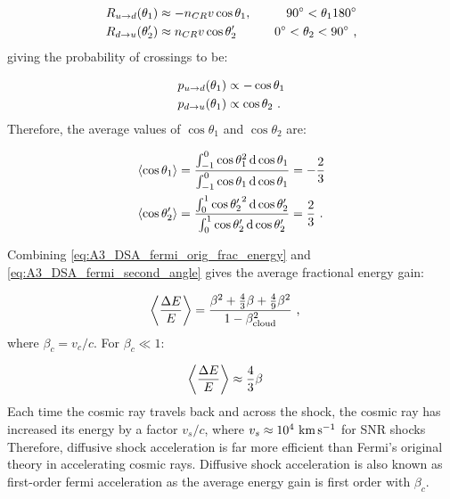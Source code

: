 \begin{alignat}{2}
    R_{u\rightarrow d}\qty(\theta_1)&\approx-n_{CR}v\cos\theta_1,\quad &\ang{90}<\theta_1\ang{180} \\
    R_{d\rightarrow u}\qty(\theta_2')&\approx n_{CR}v\cos\theta_2'\quad&\ang{0}<\theta_2<\ang{90} \text{ ,}
\end{alignat}
\noindent giving the probability of crossings to be:

\begin{equation}
    \begin{aligned}
        p_{u\rightarrow d}\qty(\theta_1)&\propto -\cos\theta_1 \\
        p_{d\rightarrow u}\qty(\theta_1)&\propto \cos\theta_2  \text{ .}
    \end{aligned}
\end{equation}
\noindent Therefore, the average values of $\cos\theta_1$ and $\cos\theta_2$ are:

\begin{equation}
    \begin{aligned}
    \left\langle \cos\theta_1 \right\rangle&=\frac{\int_{-1}^{0} \cos\theta_1^2\dd{\cos\theta_1}}{\int_{-1}^{0}\cos\theta_1 \dd{\cos\theta_1}}=-\frac{2}{3} \\
    \left\langle \cos\theta_2' \right\rangle&=\frac{\int_{0}^{1} {\cos\theta_2'}^2\dd{\cos\theta_2'}}{\int_{0}^{1}\cos\theta_2' \dd{\cos\theta_2'}}=\frac{2}{3}\text{ .}
    \end{aligned} \label{eq:A3_DSA_fermi_second_angle}
\end{equation}

\noindent Combining \autoref{eq:A3_DSA_fermi_orig_frac_energy} and \autoref{eq:A3_DSA_fermi_second_angle} gives the average fractional energy gain:

\begin{equation}
    \begin{aligned}
    \left\langle \frac{\Delta E}{E} \right\rangle
	&=\frac{\beta^2+\frac{4}{3}\beta+\frac{4}{9}\beta^2}{1-\beta_\text{cloud}^2}\text{ ,}
    \end{aligned} 
\end{equation}
\noindent where $\beta_c=v_c/c$. For $\beta_c\ll 1$:

\begin{equation}
    \begin{aligned}
    \left\langle \frac{\Delta E}{E} \right\rangle
	&\approx \frac{4}{3}\beta 
    \end{aligned} 
\end{equation}
\noindent Each time the cosmic ray travels back and across the shock, the cosmic ray has increased its energy by a factor $v_s/c$, where $v_s\approx 10^4~\si{\kilo\meter\per\second}$ for SNR shocks Therefore, diffusive shock acceleration is far more efficient than Fermi's original theory in accelerating cosmic rays.  Diffusive shock acceleration is also known as first-order fermi acceleration as the average energy gain is first order with $\beta_c$. 